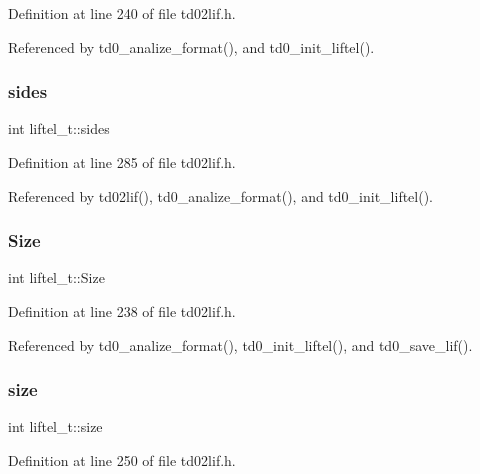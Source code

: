Definition at line 240 of file td02lif.\+h.



Referenced by td0\+\_\+analize\+\_\+format(), and td0\+\_\+init\+\_\+liftel().

\mbox{\label{structliftel__t_aabd804e27f6ab37de1ef9b890a0f1088}} 
\subsubsection{\texorpdfstring{sides}{sides}}
{\footnotesize\ttfamily int liftel\+\_\+t\+::sides}



Definition at line 285 of file td02lif.\+h.



Referenced by td02lif(), td0\+\_\+analize\+\_\+format(), and td0\+\_\+init\+\_\+liftel().

\mbox{\label{structliftel__t_a9fe4b5bc923dd0ac989c7f0cacf19d30}} 
\subsubsection{\texorpdfstring{Size}{Size}}
{\footnotesize\ttfamily int liftel\+\_\+t\+::\+Size}



Definition at line 238 of file td02lif.\+h.



Referenced by td0\+\_\+analize\+\_\+format(), td0\+\_\+init\+\_\+liftel(), and td0\+\_\+save\+\_\+lif().

\mbox{\label{structliftel__t_a7c0102997f04b216d2ec895495899b7f}} 
\subsubsection{\texorpdfstring{size}{size}}
{\footnotesize\ttfamily int liftel\+\_\+t\+::size}



Definition at line 250 of file td02lif.\+h.



